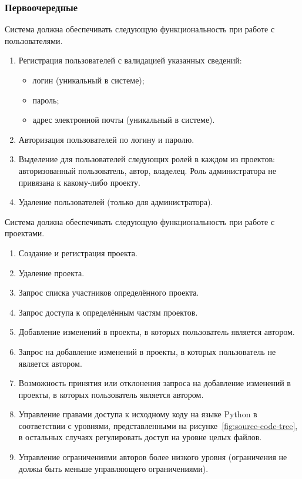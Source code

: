 \documentclass{bmstu}
\begin{document}
  \subsubsection{Первоочередные}

  Система должна обеспечивать следующую функциональность при работе с пользователями.
  \begin{enumerate}[label*=\arabic*.]
    \item Регистрация пользователей с валидацией указанных
      сведений:
      \begin{itemize}[label=---]
        \item логин (уникальный в системе);
        \item пароль;
        \item адрес электронной почты (уникальный в системе).
      \end{itemize}
    \item Авторизация пользователей по логину и паролю.
    \item Выделение для пользователей следующих ролей в каждом из проектов: авторизованный пользователь, автор, владелец. Роль администратора не привязана к какому-либо проекту.
    \item Удаление пользователей (только для администратора).
  \end{enumerate}

  Система должна обеспечивать следующую функциональность при работе с проектами.
  \begin{enumerate}[label*=\arabic*.]
    \item Создание и регистрация проекта.
    \item Удаление проекта.
    \item Запрос списка участников определённого проекта.
    \item Запрос доступа к определённым частям проектов.
    \item Добавление изменений в проекты, в которых пользователь является автором.
    \item Запрос на добавление изменений в проекты, в которых пользователь не является автором.
    \item Возможность принятия или отклонения запроса на добавление изменений в проекты, в которых пользователь является автором.
    \item Управление правами доступа к исходному коду на языке Python в соответствии с уровнями, представленными на рисунке~\ref{fig:source-code-tree}, в остальных случаях регулировать доступ на уровне целых файлов.
    \item Управление ограничениями авторов более низкого уровня (ограничения не должы быть меньше управляющего ограничениями).
  \end{enumerate}
\end{document}
